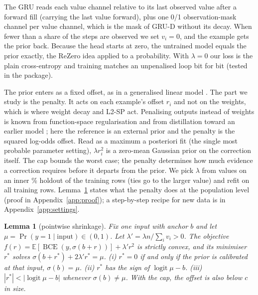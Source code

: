 \documentclass{article}
\newtheorem{lemma}{Lemma}
\begin{document}
The GRU reads each value channel relative to its last observed value after a forward fill (carrying the last value
forward), plus one 0/1 observation-mask channel per value channel, which is the mask of GRU-D \citep{che2018grud}
without its decay. When fewer than a share \nMinObs{} of the steps are observed we set $v_i = 0$, and the example
gets the prior back. Because the head starts at zero, the untrained model equals the prior exactly, the ReZero idea
\citep{bachlechner2021rezero} applied to a probability. With $\lambda = 0$ our loss is the plain cross-entropy and
training matches an unpenalised loop bit for bit (tested in the package).

The prior enters as a fixed offset, as in a generalised linear model \citep{mccullagh1989glm}. The part we study
is the penalty. It acts on each example's offset $r_i$ and not on the weights, which is where weight decay and L2-SP
\citep{li2018l2sp} act. Penalising outputs instead of weights is known from function-space regularisation
\citep{benjamin2019function} and from distillation toward an earlier model \citep{li2018lwf}; here the reference is
an external prior and the penalty is the squared log-odds offset. Read as a maximum a posteriori fit (the single most probable parameter
setting), $\lambda r_i^2$ is a zero-mean Gaussian prior on the correction itself. The cap bounds the worst case; the
penalty determines how much evidence a correction requires before it departs from the prior. We pick $\lambda$ from \nSweepCount{} values
on an inner \nInnerPct\% holdout of the training rows (ties go to the larger value) and refit on all training
rows. Lemma~\ref{lem:shrink}
states what the penalty does at the population level (proof in Appendix~\ref{app:proof}); a step-by-step recipe
for new data is in Appendix~\ref{app:settings}.

\begin{lemma}[pointwise shrinkage]
\label{lem:shrink}
Fix one input with anchor $b$ and let $\mu = \Pr(y = 1 \mid \text{input}) \in (0,1)$. Let
$\lambda' = \lambda n / \sum_i v_i > 0$. The objective $f(r) = \mathbb{E}[\operatorname{BCE}(y, \sigma(b + r))] +
\lambda' r^2$ is strictly convex, and its minimiser $r^{*}$ solves $\sigma(b + r^{*}) + 2\lambda' r^{*} = \mu$.
(i) $r^{*} = 0$ if and only if the prior is calibrated at that input, $\sigma(b) = \mu$.
(ii) $r^{*}$ has the sign of $\operatorname{logit}\mu - b$.
(iii) $|r^{*}| < |\operatorname{logit}\mu - b|$ whenever $\sigma(b) \neq \mu$.
With the cap, the offset is also below $c$ in size.
\end{lemma}
\end{document}
